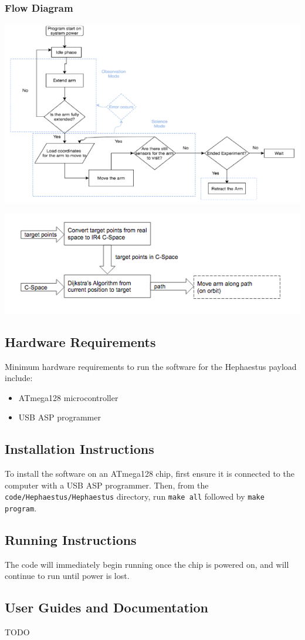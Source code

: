 \subsubsection{Flow Diagram}
\includegraphics[width=\textwidth]{./images/ProjectDocs/flowDiagram}

\includegraphics[width=\textwidth]{./images/ProjectDocs/pathingAndAutomationFlow}

\subsection{Hardware Requirements}
Minimum hardware requirements to run the software for the Hephaestus payload include:
\begin{itemize}
	\item{ATmega128 microcontroller}
	\item{USB ASP programmer}
\end{itemize}

\subsection{Installation Instructions}
To install the software on an ATmega128 chip, first ensure it is connected to
the computer with a USB ASP programmer. Then, from the 
\texttt{code/Hephaestus/Hephaestus} directory, run \texttt{make all}
followed by \texttt{make program}.

\subsection{Running Instructions}
The code will immediately begin running once the chip is powered on, and will
continue to run until power is lost.

\subsection{User Guides and Documentation}
TODO

